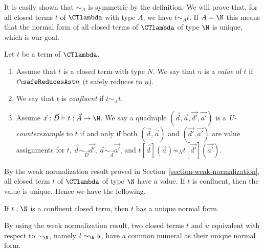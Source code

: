 It is easily shown that $\sim_A$ is symmetric by the definition. 
We will prove that, for all closed terms $t$ of $\CTlambda$ with type $A$, we have $t \sim_A t$.
If $A=\N$ this means that the normal form of all closed terms of $\CTlambda$ of type $\N$ is unique,
which is our goal.

\begin{definition}
  Let $t$ be a term of $\CTlambda$. 
  \begin{enumerate}
  \item
    Assume that $t$ is a closed term with type $N$. 
    We say that $n$ is a {\em value} of $t$ if $t \safeReducesAst n$ ($t$ safely reduces to $n$). 
  \item
    We say that $t$ is {\em confluent} if $t \sim_A t$.
  \item
    Assume $\vec{x}:\vec{D}\vdash t:\vec{A}\rightarrow\N$. 
    We say a quadraple $(\vec{d},\vec{a},\vec{d'},\vec{a'})$ is a {\em U-counterexample} to $t$
    if and only if
    both $(\vec{d},\vec{a})$ and $(\vec{d'},\vec{a'})$ are value assignments for $t$, 
    $\vec{d}\sim_{\vec{D}}\vec{d'}$, $\vec{a}\sim_{\vec{A}}\vec{a'}$, and
    $t[\vec{d}](\vec{a}) \not\sim_N t[\vec{d'}](\vec{a'})$. 
  \end{enumerate}
\end{definition}

By the weak normalization result proved in Section~\ref{section-weak-normalization}, all 
closed term $t$ of $\CTlambda$ of type $\N$ have a value. If $t$ is confluent, then the value is unique.
Hence we have the following. 

\begin{lemma}
  If $t:\N$ is a confluent closed term, then $t$ has a unique normal form.
\end{lemma}

By using the weak normalization result, 
two closed terms $t$ and $u$ equivalent with respect to $\sim_\N$, namely $t \sim_\N u$,
have a common numeral as their unique normal form. 

